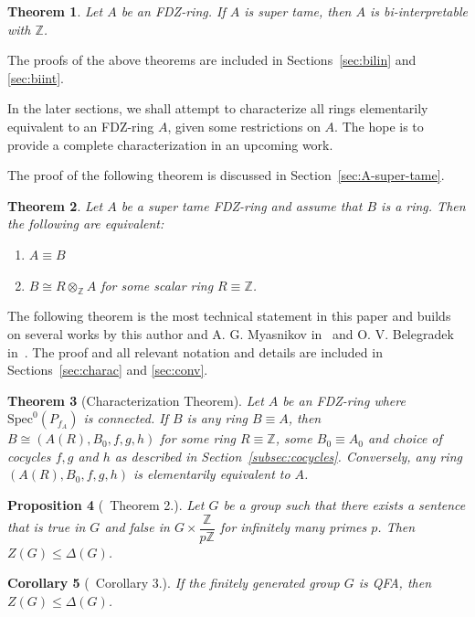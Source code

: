 \documentclass{article}
\newtheorem{theorem}{Theorem}[section]
\newtheorem{cor}[theorem]{Corollary}
\newtheorem{prop}[theorem]{Proposition}
\theoremstyle{remark}
\def\Z{{\mathbb{Z}}}
\begin{document}
\begin{theorem}\label{thm:Main3} Let $A$ be an FDZ-ring. If $A$ is super tame, then $A$ is bi-interpretable with $\Z$.\end{theorem}

The proofs of the above theorems are included in Sections~\ref{sec:bilin} and \ref{sec:biint}.

In the later sections, we shall attempt to characterize all rings elementarily equivalent to an FDZ-ring $A$, given some restrictions on $A$. The hope is to provide a complete characterization in an upcoming work.

The proof of the following theorem is discussed in Section~\ref{sec:A-super-tame}.
\begin{theorem}\label{thm:main4} Let $A$ be a super tame FDZ-ring and assume that $B$ is a ring. Then the following are equivalent:
\begin{enumerate}
    \item $A\equiv B$
    \item $B\cong R\otimes_{\Z}A$ for some scalar ring $R\equiv \Z$.   
    \end{enumerate}
\end{theorem}
The following theorem is the most technical statement in this paper and builds on several works by this author and A. G. Myasnikov in~\cite{MS, MS2010, MS2021, MS2024} and O. V. Belegradek in~\cite{beleg94}. The proof and all relevant notation and details are included in Sections~\ref{sec:charac} and \ref{sec:conv}. 

\begin{theorem}[Characterization Theorem]\label{thm:char} Let $A$ be an FDZ-ring where $\text{Spec}^0(P_{f_A})$ is connected. If $B$ is any ring $B\equiv A$, then
$B\cong (A(R),B_0, f,g,h)$
for some ring $R\equiv \Z$, some $B_0\equiv A_0$ and choice of cocycles $f,g$ and $h$ as described in Section~\ref{subsec:cocycles}. Conversely, any ring $(A(R),B_0,f,g,h)$ is elementarily equivalent to $A$.  \end{theorem}
\iffalse
\begin{prop}[\cite{Oger2006}~Theorem 2.]\label{Oger-qfa1:thm}
Let $G$ be a group such that there exists a sentence that is true in $G$ and
false in $G \times \dfrac{\Z}{p\Z}$ for infinitely many primes $p$. Then $Z(G)\leq \Delta(G)$.
\end{prop}
\begin{cor}[\cite{Oger2006}~Corollary 3.] \label{Oger-qfa1:cor}If the finitely generated group $G$ is QFA, then $Z(G)\leq \Delta(G)$.\end{cor}
\end{document}
